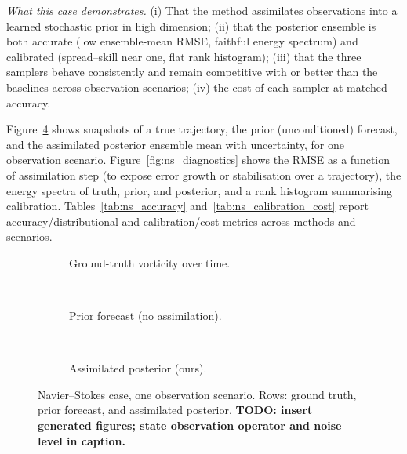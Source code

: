 \emph{What this case demonstrates.} (i) That the method assimilates observations into a learned stochastic prior in high dimension; (ii) that the posterior ensemble is both accurate (low ensemble-mean RMSE, faithful energy spectrum) and calibrated (spread--skill near one, flat rank histogram); (iii) that the three samplers behave consistently and remain competitive with or better than the baselines across observation scenarios; (iv) the cost of each sampler at matched accuracy.

Figure~\ref{fig:ns_trajectories} shows snapshots of a true trajectory, the prior (unconditioned) forecast, and the assimilated posterior ensemble mean with uncertainty, for one observation scenario. Figure~\ref{fig:ns_diagnostics} shows the RMSE as a function of assimilation step (to expose error growth or stabilisation over a trajectory), the energy spectra of truth, prior, and posterior, and a rank histogram summarising calibration. Tables~\ref{tab:ns_accuracy} and~\ref{tab:ns_calibration_cost} report accuracy/distributional and calibration/cost metrics across methods and scenarios.

\begin{figure}[ht]
    \centering
    \begin{subfigure}{\linewidth}\centering
        \caption{Ground-truth vorticity over time.}\label{fig:ns_true}
    \end{subfigure}\\[3pt]
    \begin{subfigure}{\linewidth}\centering
        \caption{Prior forecast (no assimilation).}\label{fig:ns_prior}
    \end{subfigure}\\[3pt]
    \begin{subfigure}{\linewidth}\centering
        \caption{Assimilated posterior (ours).}\label{fig:ns_post}
    \end{subfigure}
    \caption{Navier--Stokes case, one observation scenario. Rows: ground truth, prior forecast, and assimilated posterior. \textbf{TODO: insert generated figures; state observation operator and noise level in caption.}}
    \label{fig:ns_trajectories}
\end{figure}


